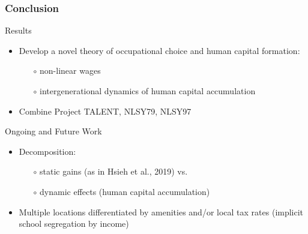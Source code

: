 \documentclass[11pt]{beamer}
\begin{document}
\begin{frame}
	\frametitle{Conclusion}
 \small
	\textcolor{tblue}{Results}
	\begin{itemize}
		\item Develop a novel theory of occupational choice and human capital formation: 
		\begin{itemize}
			\item[$\circ$] non-linear wages %
			\item[$\circ$] intergenerational dynamics of human capital accumulation
		\end{itemize}
        \item Combine Project TALENT, NLSY79, NLSY97
	\end{itemize}
	\textcolor{tblue}{Ongoing and Future Work}
	\begin{itemize}	
        \item Decomposition:
            \begin{itemize}
			\item[$\circ$] static gains (as in Hsieh et al., 2019) vs.
			\item[$\circ$] dynamic effects (human capital accumulation)
		\end{itemize}
		\item Multiple locations differentiated by amenities and/or local tax rates (implicit school segregation by income)
	\end{itemize}
\end{frame}
\end{document}
